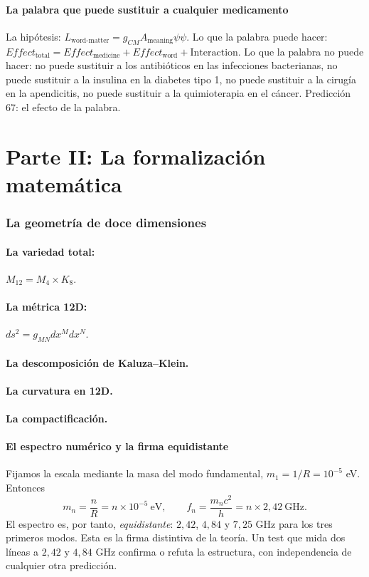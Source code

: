 \documentclass[11pt,a4paper]{article}
\begin{document}
\subsection{La palabra que puede sustituir a cualquier medicamento}
La hipótesis: $L_{\text{word-matter}} = g_{CM} A_{\text{meaning}} \psi \psi$. Lo que la palabra puede hacer: $Effect_{\text{total}} = Effect_{\text{medicine}} + Effect_{\text{word}} + \text{Interaction}$. Lo que la palabra no puede hacer: no puede sustituir a los antibióticos en las infecciones bacterianas, no puede sustituir a la insulina en la diabetes tipo 1, no puede sustituir a la cirugía en la apendicitis, no puede sustituir a la quimioterapia en el cáncer. Predicción 67: el efecto de la palabra.

\newpage
\part*{Parte II: La formalización matemática}

\section{La geometría de doce dimensiones}
\subsection{La variedad total:} $M_{12} = M_4 \times K_8$.
\subsection{La métrica 12D:} $ds^2 = g_{MN} dx^M dx^N$.
\subsection{La descomposición de Kaluza--Klein.}
\subsection{La curvatura en 12D.}
\subsection{La compactificación.}

\subsection{El espectro numérico y la firma equidistante}
Fijamos la escala mediante la masa del modo fundamental, $m_1 = 1/R = 10^{-5}$ eV. Entonces
\begin{equation}
m_n = \frac{n}{R} = n \times 10^{-5}\ \text{eV},
\qquad
f_n = \frac{m_n c^2}{h} = n \times 2,42\ \text{GHz}.
\end{equation}
El espectro es, por tanto, \emph{equidistante}: $2,42$, $4,84$ y $7,25$ GHz para los tres primeros modos. Esta es la firma distintiva de la teoría. Un test que mida dos líneas a $2,42$ y $4,84$ GHz confirma o refuta la estructura, con independencia de cualquier otra predicción.
\end{document}
